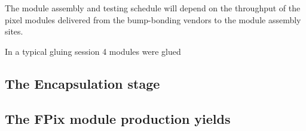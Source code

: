 The module assembly and testing schedule will depend on the throughput of the pixel modules delivered from the bump-bonding vendors to the module
assembly sites.

In a typical gluing session 4 modules were glued  

\subsection{The Encapsulation stage}


\subsection{The FPix module production yields}

